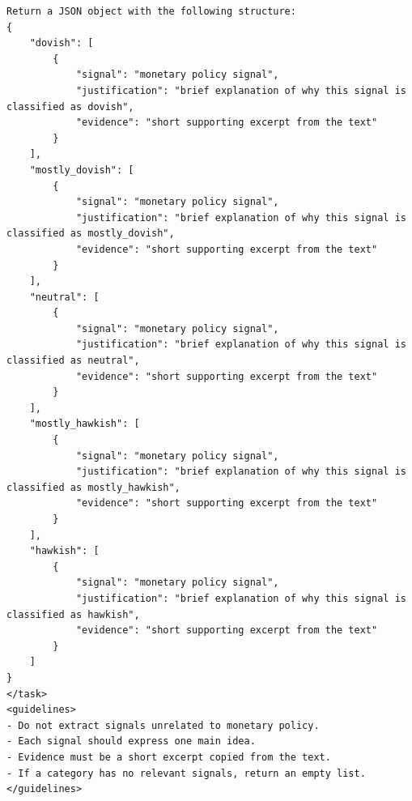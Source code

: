 \begin{Verbatim}[breaklines=true,breakanywhere=true,fontsize=\small]
Return a JSON object with the following structure:
{
	"dovish": [
		{
			"signal": "monetary policy signal",
			"justification": "brief explanation of why this signal is classified as dovish",
			"evidence": "short supporting excerpt from the text"
		}
	],
	"mostly_dovish": [
		{
			"signal": "monetary policy signal",
			"justification": "brief explanation of why this signal is classified as mostly_dovish",
			"evidence": "short supporting excerpt from the text"
		}
	],
	"neutral": [
		{
			"signal": "monetary policy signal",
			"justification": "brief explanation of why this signal is classified as neutral",
			"evidence": "short supporting excerpt from the text"
		}
	],
	"mostly_hawkish": [
		{
			"signal": "monetary policy signal",
			"justification": "brief explanation of why this signal is classified as mostly_hawkish",
			"evidence": "short supporting excerpt from the text"
		}
	],
	"hawkish": [
		{
			"signal": "monetary policy signal",
			"justification": "brief explanation of why this signal is classified as hawkish",
			"evidence": "short supporting excerpt from the text"
		}
	]
}
</task>
<guidelines>
- Do not extract signals unrelated to monetary policy.
- Each signal should express one main idea.
- Evidence must be a short excerpt copied from the text.
- If a category has no relevant signals, return an empty list.
</guidelines>
\end{Verbatim}
